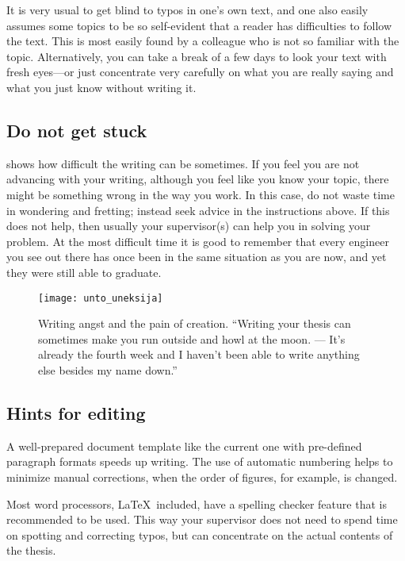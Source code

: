 It is very usual to get blind to typos in one’s own text, and one also easily assumes some topics to be so self-evident that a reader has difficulties to follow the text. This is most easily found by a colleague who is not so familiar with the topic. Alternatively, you can take a break of a few days to look your text with fresh eyes---or just concentrate very carefully on what you are really saying and what you just know without writing it.

\subsection{Do not get stuck}

 shows how difficult the writing can be sometimes. If you feel you are not advancing with your writing, although you feel like you know your topic, there might be something wrong in the way you work. In this case, do not waste time in wondering and fretting; instead seek advice in the instructions above. If this does not help, then usually your supervisor(s) can help you in solving your problem. At the most difficult time it is good to remember that every engineer you see out there has once been in the same situation as you are now, and yet they were still able to graduate.

\begin{figure}[ht]
  \begin{center}
    \texttt{[image: unto\_uneksija]}
  \end{center}
  \caption{Writing angst and the pain of creation. “Writing your thesis can sometimes
make you run outside and howl at the moon. --- It’s already the fourth week and I
haven’t been able to write anything else besides my name down.”}
  \label{fig:unto_uneksija}
\end{figure}

\subsection{Hints for editing}

A well-prepared document template like the current one with pre-defined paragraph formats speeds up writing. The use of automatic numbering helps to minimize manual corrections, when the order of figures, for example, is changed.

Most word processors, \LaTeX\ included, have a spelling checker feature that is recommended to be used. This way your supervisor does not need to spend time on spotting and correcting typos, but can concentrate on the actual contents of the thesis.

